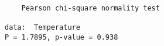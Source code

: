 \begin{verbatim} 

	Pearson chi-square normality test

data:  Temperature
P = 1.7895, p-value = 0.938

\end{verbatim}